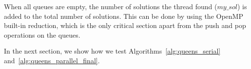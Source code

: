 When all queues are empty, the number of solutions the thread found ($my\_sol$) is added to the total number of solutions.
This can be done by using the OpenMP built-in reduction, which is the only critical section apart from the push and pop operations on the queues.

In the next section, we show how we test Algorithms~\ref{alg:queens_serial} and~\ref{alg:queens_parallel_final}.